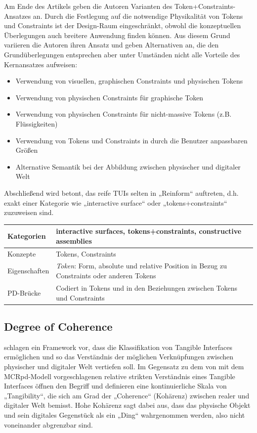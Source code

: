 Am Ende des Artikels geben die Autoren Varianten des Token+Constraints-Ansatzes an. Durch die Festlegung auf die notwendige Physikalität von Tokens und Constraints ist der Design-Raum eingeschränkt, obwohl die konzeptuellen Überlegungen auch breitere Anwendung finden können. Aus diesem Grund variieren die Autoren ihren Ansatz und geben Alternativen an, die den Grundüberlegungen entsprechen aber unter Umständen nicht alle Vorteile des Kernansatzes aufweisen:
\begin{itemize}
	\item Verwendung von visuellen, graphischen Constraints und physischen Tokens
	\item Verwendung von physischen Constraints für graphische Token
	\item Verwendung von physischen Constraints für nicht-massive Tokens (z.B. Flüssigkeiten)
	\item Verwendung von Tokens und Constraints in durch die Benutzer anpassbaren Größen
	\item Alternative Semantik bei der Abbildung zwischen physischer und digitaler Welt
\end{itemize}

Abschließend wird betont, das reife \glspl{TUI} selten in „Reinform“ auftreten, d.h. exakt einer Kategorie wie „interactive surface“ oder „tokens+constraints“ zuzuweisen sind. 

\begin{tabular}{| p{3cm} | p{10cm} |}
  \hline
  Kategorien & interactive surfaces, tokens+constraints, constructive assemblies \\ \hline
  Konzepte & Tokens, Constraints \\ \hline
  Eigenschaften & \emph{Token}: Form, absolute und relative Position in Bezug zu Constraints oder anderen Tokens \\ \hline
  PD-Brücke & Codiert in Tokens und in den Beziehungen zwischen Tokens und Constraints \\ \hline
\end{tabular} 


\subsection{Degree of Coherence} %
\label{sub:degree_of_coherence}
\citet{Koleva03} schlagen ein Framework vor, dass die Klassifikation von Tangible Interfaces ermöglichen und so das Verständnis der möglichen Verknüpfungen zwischen physischer und digitaler Welt vertiefen soll. Im Gegensatz zu dem von \citet{Ullmer00} mit dem MCRpd-Modell vorgeschlagenen relative strikten Verständnis eines Tangible Interfaces öffnen \citeauthor{Koleva03} den Begriff und definieren eine kontinuierliche Skala von „Tangibility“, die sich am Grad der „Coherence“ (Kohärenz) zwischen realer und digitaler Welt bemisst. Hohe Kohärenz sagt dabei aus, dass das physische Objekt und sein digitales Gegenstück als ein „Ding“ wahrgenommen werden, also nicht voneinander abgrenzbar sind.

